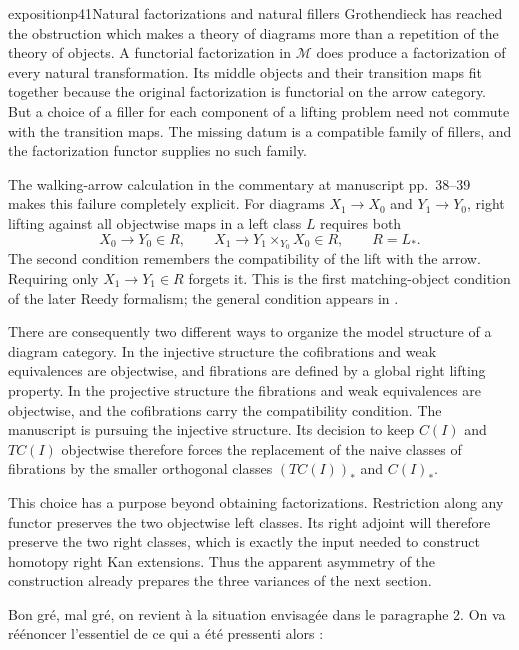 \begin{dcomment}{exposition}{p41}{Natural factorizations and natural fillers}
Grothendieck has reached the obstruction which makes a theory of diagrams more than a repetition of the theory of objects. A functorial factorization in $\mathcal M$ does produce a factorization of every natural transformation. Its middle objects and their transition maps fit together because the original factorization is functorial on the arrow category. But a choice of a filler for each component of a lifting problem need not commute with the transition maps. The missing datum is a compatible family of fillers, and the factorization functor supplies no such family.

The walking-arrow calculation in the commentary at manuscript pp.~38--39 makes this failure completely explicit. For diagrams $X_1\to X_0$ and $Y_1\to Y_0$, right lifting against all objectwise maps in a left class $L$ requires both
\[
 X_0\longrightarrow Y_0\in R,
 \qquad X_1\longrightarrow Y_1\mathbin{\times}_{Y_0}X_0\in R,
 \qquad R=L_*.
\]
The second condition remembers the compatibility of the lift with the arrow. Requiring only $X_1\to Y_1\in R$ forgets it. This is the first matching-object condition of the later Reedy formalism; the general condition appears in \citet[Definition~5.2.2 and Theorem~5.2.5]{Hovey1999}.

There are consequently two different ways to organize the model structure of a diagram category. In the injective structure the cofibrations and weak equivalences are objectwise, and fibrations are defined by a global right lifting property. In the projective structure the fibrations and weak equivalences are objectwise, and the cofibrations carry the compatibility condition. The manuscript is pursuing the injective structure. Its decision to keep $C(I)$ and $TC(I)$ objectwise therefore forces the replacement of the naive classes of fibrations by the smaller orthogonal classes $(TC(I))_*$ and $C(I)_*$.

This choice has a purpose beyond obtaining factorizations. Restriction along any functor preserves the two objectwise left classes. Its right adjoint will therefore preserve the two right classes, which is exactly the input needed to construct homotopy right Kan extensions. Thus the apparent asymmetry of the construction already prepares the three variances of the next section.
\end{dcomment}


Bon gré, mal gré, on revient à la situation envisagée dans le paragraphe 2. On va réénoncer l'essentiel de ce qui a été pressenti alors :

